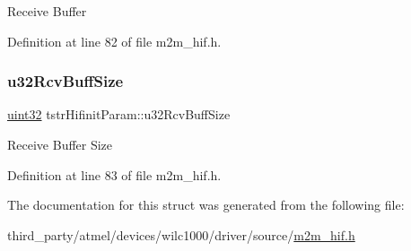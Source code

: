 Receive Buffer 

Definition at line 82 of file m2m\+\_\+hif.\+h.

\mbox{\label{structtstrHifinitParam_a0a0ef27c7b11c7e708fc4a4e694edec2}} 
\subsubsection{\texorpdfstring{u32\+Rcv\+Buff\+Size}{u32RcvBuffSize}}
{\footnotesize\ttfamily \hyperlink{group__DataT_ga100e7c691a47d6978527c479a0158245}{uint32} tstr\+Hifinit\+Param\+::u32\+Rcv\+Buff\+Size}

Receive Buffer Size 

Definition at line 83 of file m2m\+\_\+hif.\+h.



The documentation for this struct was generated from the following file\+:\begin{DoxyCompactItemize}
\item 
third\+\_\+party/atmel/devices/wilc1000/driver/source/\hyperlink{m2m__hif_8h}{m2m\+\_\+hif.\+h}\end{DoxyCompactItemize}
